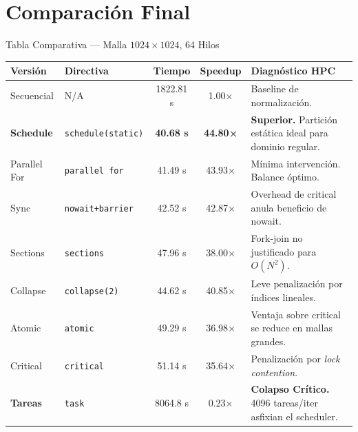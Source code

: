 \documentclass[aspectratio=169,10pt,xcolor=table]{beamer}
\begin{document}
\section{Comparación Final}

\begin{frame}{Tabla Comparativa — Malla $1024\times1024$, 64 Hilos}
  \begin{center}
  \scriptsize
  \renewcommand{\arraystretch}{1.1}
  \begin{tabularx}{\textwidth}{@{}l l c c X@{}}
    \toprule
    \textbf{Versión} & \textbf{Directiva} & \textbf{Tiempo} & \textbf{Speedup} & \textbf{Diagnóstico HPC} \\
    \midrule
    Secuencial        & N/A                  & 1822.81 s  & 1.00×   & Baseline de normalización. \\
    \rowcolor{UDlight}
    \textbf{Schedule} & \texttt{schedule(static)} & \textbf{40.68 s} & \textbf{44.80×} & \textbf{Superior.} Partición estática ideal para dominio regular. \\
    Parallel For & \texttt{parallel for} & 41.49 s & 43.93× & Mínima intervención. Balance óptimo. \\
    Sync              & \texttt{nowait+barrier}  & 42.52 s    & 42.87×  & Overhead de critical anula beneficio de nowait. \\
    Sections          & \texttt{sections}    & 47.96 s    & 38.00×   & Fork-join no justificado para $O(N^2)$. \\
    Collapse          & \texttt{collapse(2)} & 44.62 s    & 40.85×   & Leve penalización por índices lineales. \\
    Atomic            & \texttt{atomic}      & 49.29 s    & 36.98×   & Ventaja sobre critical se reduce en mallas grandes. \\
    Critical          & \texttt{critical}    & 51.14 s    & 35.64×   & Penalización por \emph{lock contention}. \\
    \rowcolor{UDsecond!15}
    \textbf{Tareas}   & \texttt{task}        & 8064.8 s   & 0.23×   & \textbf{Colapso Crítico.} 4096 tareas/iter asfixian el scheduler. \\
    \bottomrule
  \end{tabularx}
  \end{center}
  \vspace{0.2cm}
  \begin{columns}[t]

\end{columns}
\end{frame}
\end{document}

